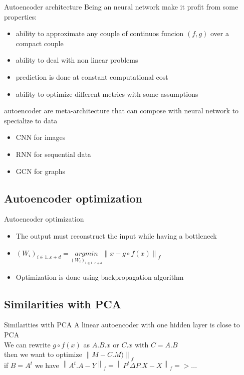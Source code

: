 \documentclass{beamer}
\newcommand{\norm}[1]{\left\lVert#1\right\rVert}
\begin{document}
\begin{frame}{Autoencoder architecture}
	Being an neural network make it profit from some properties:
	\begin{itemize}
		\item ability to approximate any couple of continuos funcion $(f,g)$ over a compact couple
		\item ability to deal with non linear problems
		\item prediction is done at constant computational cost
		\item ability to optimize different metrics with some assumptions 
	\end{itemize}
	autoencoder are meta-architecture that can compose with neural network to specialize to data
	\begin{itemize}
		\item CNN for images 
		\item RNN for sequential data
		\item GCN for graphs
	\end{itemize}
\end{frame}

\subsection{Autoencoder optimization}
\begin{frame}{Autoencoder optimization}
	\begin{itemize}
		\item The output must reconstruct the input while having a bottleneck
		\item $(W_i)_{i \in {1 .. e+d}} = \underset{(W_i)_{i \in {1 .. e+d}}}{argmin} \norm{ x - g \circ f(x)}_f$
		\item Optimization is done using backpropagation algorithm
	\end{itemize}
\end{frame}

\subsection{Similarities with PCA}
\begin{frame}{Similarities with PCA}
	A linear autoencoder with one hidden layer is close to PCA\\
	We can rewrite $g \circ f (x)$ as $A.B.x$ or $C.x$ with $C = A.B$\\
	then we want to optimize $\norm{ M - C.M)}_f$ \\ 
	if $B = A^{t}$ we have $\norm{A^{t}.A - Y}_f = \norm{ P^t \Delta P. X - X}_f => ... $
\end{frame}
\end{document}
